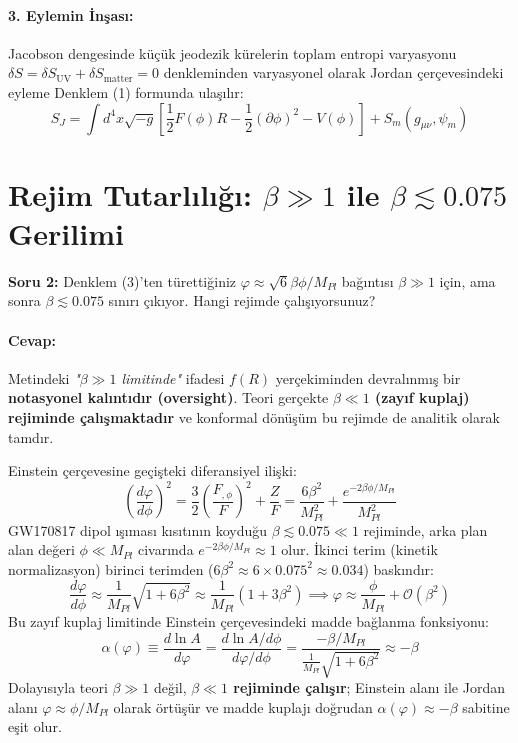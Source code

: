 \documentclass[11pt,a4paper]{article}
\begin{document}
\paragraph{3. Eylemin İnşası:}
Jacobson dengesinde küçük jeodezik kürelerin toplam entropi varyasyonu $\delta S = \delta S_{\text{UV}} + \delta S_{\text{matter}} = 0$ denkleminden varyasyonel olarak Jordan çerçevesindeki eyleme Denklem (1) formunda ulaşılır:
\begin{equation}
S_J = \int d^4x \sqrt{-g} \left[ \frac{1}{2} F(\phi) R - \frac{1}{2} (\partial\phi)^2 - V(\phi) \right] + S_m(g_{\mu\nu}, \psi_m)
\end{equation}

\section{Rejim Tutarlılığı: $\beta \gg 1$ ile $\beta \lesssim 0.075$ Gerilimi}

\begin{questionbox}
\textbf{Soru 2:} Denklem (3)’ten türettiğiniz $\varphi \approx \sqrt{6} \beta \phi / M_{Pl}$ bağıntısı $\beta \gg 1$ için, ama sonra $\beta \lesssim 0.075$ sınırı çıkıyor. Hangi rejimde çalışıyorsunuz?
\end{questionbox}

\paragraph{Cevap:}
Metindeki \textit{"$\beta \gg 1$ limitinde"} ifadesi $f(R)$ yerçekiminden devralınmış bir \textbf{notasyonel kalıntıdır (oversight)}. Teori gerçekte \textbf{$\beta \ll 1$ (zayıf kuplaj) rejiminde çalışmaktadır} ve konformal dönüşüm bu rejimde de analitik olarak tamdır.

Einstein çerçevesine geçişteki diferansiyel ilişki:
\begin{equation}
\left( \frac{d\varphi}{d\phi} \right)^2 = \frac{3}{2} \left( \frac{F_{,\phi}}{F} \right)^2 + \frac{Z}{F} = \frac{6\beta^2}{M_{Pl}^2} + \frac{e^{-2\beta\phi/M_{Pl}}}{M_{Pl}^2}
\end{equation}
GW170817 dipol ışıması kısıtının koyduğu $\beta \lesssim 0.075 \ll 1$ rejiminde, arka plan alan değeri $\phi \ll M_{Pl}$ civarında $e^{-2\beta\phi/M_{Pl}} \approx 1$ olur. İkinci terim (kinetik normalizasyon) birinci terimden ($6\beta^2 \approx 6 \times 0.075^2 \approx 0.034$) baskındır:
\begin{equation}
\frac{d\varphi}{d\phi} \approx \frac{1}{M_{Pl}} \sqrt{1 + 6\beta^2} \approx \frac{1}{M_{Pl}} (1 + 3\beta^2) \implies \varphi \approx \frac{\phi}{M_{Pl}} + \mathcal{O}(\beta^2)
\end{equation}
Bu zayıf kuplaj limitinde Einstein çerçevesindeki madde bağlanma fonksiyonu:
\begin{equation}
\alpha(\varphi) \equiv \frac{d\ln A}{d\varphi} = \frac{d\ln A / d\phi}{d\varphi / d\phi} = \frac{-\beta / M_{Pl}}{\frac{1}{M_{Pl}}\sqrt{1 + 6\beta^2}} \approx -\beta
\end{equation}
Dolayısıyla teori $\beta \gg 1$ değil, \textbf{$\beta \ll 1$ rejiminde çalışır}; Einstein alanı ile Jordan alanı $\varphi \approx \phi / M_{Pl}$ olarak örtüşür ve madde kuplajı doğrudan $\alpha(\varphi) \approx -\beta$ sabitine eşit olur.
\end{document}
